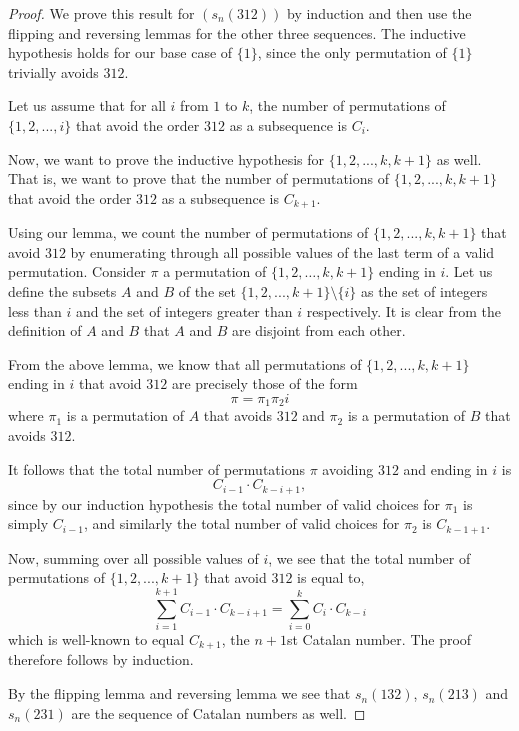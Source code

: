 \documentclass[11pt,letterpaper,twoside,english]{article}
\theoremstyle{theorem}
\theoremstyle{remark}
\begin{document}
\begin{proof}
We prove this result for $(s_n(312))$ by induction and then use the flipping and reversing lemmas for the other three sequences. The inductive hypothesis holds for our base case of $\{1\}$, since the only permutation of $\{1\}$ trivially avoids $312$.

Let us assume that for all $i$ from $1$ to $k$, the number of permutations of $\{1,2,...,i\}$ that avoid the order $312$ as a subsequence is $C_i$.

Now, we want to prove the inductive hypothesis for $\{1,2,...,k,k+1\}$ as well. That is, we want to prove that the number of permutations of $\{1,2,...,k,k+1\}$ that avoid the order $312$ as a subsequence is $C_{k+1}$.

Using our lemma, we count the number of permutations of $\{1,2,...,k,k+1\}$ that avoid $312$ by enumerating through all possible values of the last term of a valid permutation. Consider $\pi$ a permutation of $\{1,2,\ldots, k, k+1\}$ ending in $i$. Let us define the subsets $A$ and $B$ of the  set $\{1,2,...,k+1\} \setminus \{i\}$ as the set of integers less than $i$ and the set of integers greater than $i$ respectively. It is clear from the definition of $A$ and $B$ that $A$ and $B$ are disjoint from each other.

From the above lemma, we know that all permutations of $\{1,2,...,k,k+1\}$ ending in $i$ that avoid $312$ are precisely those of the form
$$\pi = \pi_1 \pi_2 i$$
where $\pi_1$ is a permutation of $A$ that avoids $312$ and $\pi_2$ is a permutation of $B$ that avoids $312$.

It follows that the total number of permutations $\pi$ avoiding $312$ and ending in $i$ is
$$C_{i-1} \cdot C_{k-i+1},$$
since by our induction hypothesis the total number of valid choices for $\pi_1$ is simply $C_{i-1}$, and similarly the total number of valid choices for $\pi_2$ is $C_{k-1+1}$.

Now, summing over all possible values of $i$, we see that the total number of permutations of $\{1,2,...,k+1\}$ that avoid $312$ is equal to,
$$\sum_{i=1}^{k+1} C_{i-1} \cdot C_{k-i+1} = \sum_{i=0}^k C_i \cdot C_{k-i}$$ which is well-known to equal $C_{k+1}$, the $n+1$st Catalan number. The proof  therefore follows by induction.

By the flipping lemma and reversing lemma we see that  $s_n(132)$, $s_n(213)$ and $s_n(231)$ are the sequence of Catalan numbers as well. 
\end{proof}
\end{document}

